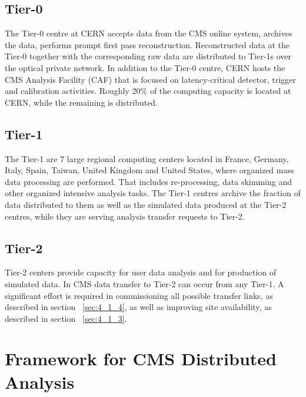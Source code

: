 \subsection{Tier-0}
\label{sec:2_1}
The Tier-0 centre at CERN accepts data from the CMS online system, archives the data, performs prompt first pass reconstruction. Reconstructed data at the Tier-0 together with the corresponding raw data are distributed to Tier-1s over the optical private network. In addition to the Tier-0 centre, CERN hosts the CMS Analysis Facility (CAF) that is focused on latency-critical detector, trigger and calibration activities.
Roughly 20\% of the computing capacity is located at CERN, while the remaining is distributed.

\subsection{Tier-1}
\label{sec:2_2}
The Tier-1 are 7 large regional computing centers located in France, Germany, Italy, Spain, Taiwan, United Kingdom and United States, where organized mass data processing are performed. That includes re-processing, data skimming and other organized intensive analysis tasks. 
The Tier-1 centres archive the fraction of data distributed to them as well as the simulated data produced at the Tier-2 centres,  while they are serving analysis transfer requests to Tier-2.

\subsection{Tier-2}
\label{sec:2_3}
Tier-2 centers provide capacity for user data analysis and for production of simulated data.
In CMS data transfer to Tier-2 can occur from any Tier-1. A significant effort is required in 
commissioning all possible transfer links, as described in section ~\ref{sec:4_1_4}, as well
as improving site availability, as described in section ~\ref{sec:4_1_3}.

\section{Framework for CMS Distributed Analysis}
\label{sec:3}
